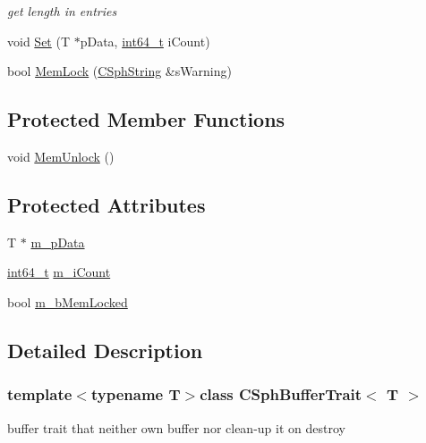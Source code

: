 \begin{DoxyCompactItemize}
\begin{DoxyCompactList}\small\item\em get length in entries \end{DoxyCompactList}\item 
void \hyperlink{classCSphBufferTrait_aa6f48edc49b8a59c89c4e26399be60ab}{Set} (T $\ast$p\-Data, \hyperlink{sphinxstd_8h_a996e72f71b11a5bb8b3b7b6936b1516d}{int64\-\_\-t} i\-Count)
\item 
bool \hyperlink{classCSphBufferTrait_a1d56d27e26ef95a31222c0a78e0cf1f2}{Mem\-Lock} (\hyperlink{structCSphString}{C\-Sph\-String} \&s\-Warning)
\end{DoxyCompactItemize}
\subsection*{Protected Member Functions}
\begin{DoxyCompactItemize}
\item 
void \hyperlink{classCSphBufferTrait_a70e9b5e74d8c9c3da6bf2dbac896386d}{Mem\-Unlock} ()
\end{DoxyCompactItemize}
\subsection*{Protected Attributes}
\begin{DoxyCompactItemize}
\item 
T $\ast$ \hyperlink{classCSphBufferTrait_aefd0a2699b1ead938018859d8d7a3945}{m\-\_\-p\-Data}
\item 
\hyperlink{sphinxstd_8h_a996e72f71b11a5bb8b3b7b6936b1516d}{int64\-\_\-t} \hyperlink{classCSphBufferTrait_acfcbe046add6dd1870d1378c1a041f6e}{m\-\_\-i\-Count}
\item 
bool \hyperlink{classCSphBufferTrait_af0836984baad89098a039426e31e9d6c}{m\-\_\-b\-Mem\-Locked}
\end{DoxyCompactItemize}


\subsection{Detailed Description}
\subsubsection*{template$<$typename T$>$class C\-Sph\-Buffer\-Trait$<$ T $>$}

buffer trait that neither own buffer nor clean-\/up it on destroy 

